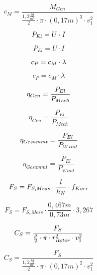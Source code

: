 $$c_M = \frac{M_{Gen}}{ \frac{1,2 \frac{kg}{m^3}}{2} \cdot \pi \cdot (0,17 m)^3 \cdot v_1^2}$$

\begin{equation}
    \centering
    P_{El} = U \cdot I
    \label{eq:230615_Elektrische_Leistung}
\end{equation}

$$P_{El} = U \cdot I$$

\begin{equation}
    \centering
    c_P = c_M \cdot \lambda
    \label{eq:230615_Leistungsbeiwert}
\end{equation}

$$c_P = c_M \cdot \lambda$$

\begin{equation}
    \centering
    \eta_{Gen} = \frac{P_{El}}{P_{Mech}}
    \label{eq:230615_Generatorwirkungsgrad}
\end{equation}

$$\eta_{Gen} = \frac{P_{El}}{P_{Mech}}$$

\begin{equation}
    \centering
    \eta_{Gesammt} = \frac{P_{El}}{P_{Wind}}
    \label{eq:230615_Gesammtwirkungsgrad}
\end{equation}

$$\eta_{Gesammt} = \frac{P_{El}}{P_{Wind}}$$

\begin{equation}
    \centering
    F_S = F_{S,Mess} \cdot \frac{l}{h_N} \cdot f_{Korr}
    \label{eq:230615_Schubkraft}
\end{equation}

$$F_S = F_{S,Mess} \cdot \frac{0,467m}{0,73m} \cdot 3,267$$

\begin{equation}
    \centering
    C_S = \frac{F_S}{\frac{\rho}{2} \cdot \pi \cdot r_{Rotor}^2 \cdot v_1^2}
    \label{eq:230615_Schubbeiwert}
\end{equation}

$$C_S = \frac{F_S}{\frac{1,2 \frac{kg}{m^3}}{2} \cdot \pi \cdot (0,17 m)^2 \cdot v_1^2}$$